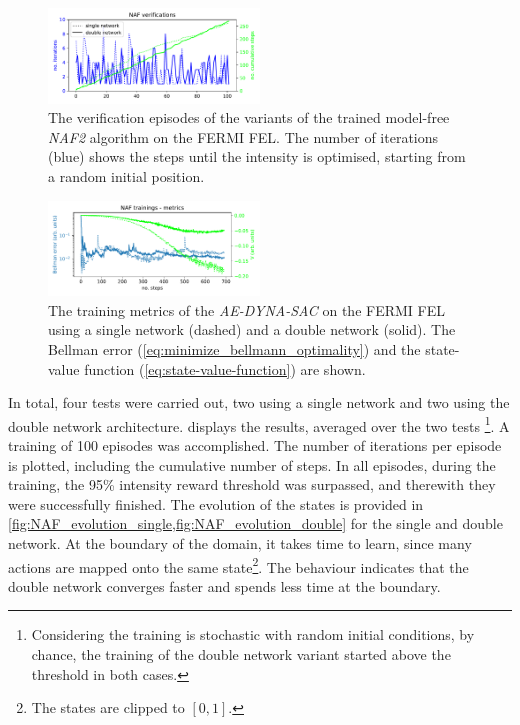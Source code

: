 \documentclass[
reprint,nofootinbib,
amsmath,amssymb,amsfonts,clevref,
aps,
prstab,
]{revtex4-2}
\begin{document}
	\begin{figure}
		\centering
		\includegraphics*[width=0.5\textwidth]{Figures/FERMI_all_experiments_NAF_verification_episodes.pdf}
		\caption{The verification episodes of the variants of the trained model-free \emph{NAF2} algorithm on the FERMI FEL. The number of iterations (blue) shows the steps until the intensity is optimised, starting from a random initial position.}
		\label{fig:NAF_verification}
	\end{figure}
	\begin{figure}
		\centering
		\includegraphics*[width=0.5\textwidth]{Figures/FERMI_all_experiments_NAF_convergence.pdf}
		\caption{The training metrics of the \emph{AE-DYNA-SAC} on the FERMI FEL using a single network (dashed) and a double network (solid). The Bellman error (\cref{eq:minimize_bellmann_optimality}) and the state-value function (\cref{eq:state-value-function}) are shown. }
		\label{fig:NAF_convergence}
	\end{figure}
	In total, four tests were carried out, two using a single network and two using the double network architecture. 
	 displays the results, averaged over the two tests \footnote{Considering the training is stochastic with random initial conditions, by chance, the training of the double network variant started above the threshold in both cases.}. A training of 100 episodes was accomplished. The number of iterations per episode is plotted, including the cumulative number of steps. In all episodes, during the training, the 95\% intensity reward threshold was surpassed, and therewith they were successfully finished. The evolution of the states is provided in \cref{fig:NAF_evolution_single,fig:NAF_evolution_double} for the single and double network. At the boundary of the domain, it takes time to learn, since many actions are mapped onto the same state\footnote{The states are clipped to $[0,1]$.}. The behaviour indicates that the double network converges faster and spends less time at the boundary.\\
\end{document}
